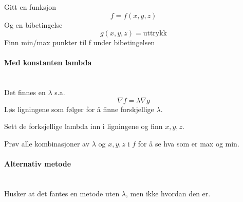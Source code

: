 Gitt en funksjon
$$f = f(x,y,z)$$
Og en bibetingelse
$$g(x,y,z) = \text{uttrykk}$$
Finn min/max punkter til f under bibetingelsen



\paragraph{Med konstanten lambda} \mbox{} \\
Det finnes en $\lambda$ s.a.
$$\nabla f = \lambda \nabla g$$
Løs ligningene som følger for å finne forskjellige $\lambda$.

Sett de forksjellige lambda inn i ligningene og finn $x,y,z$.

Prøv alle kombinasjoner av $\lambda$ og $x,y,z$ i $f$ for å se
hva som er max og min.



\paragraph{Alternativ metode} \mbox{} \\
Husker at det fantes en metode uten $\lambda$, men ikke hvordan den er.
